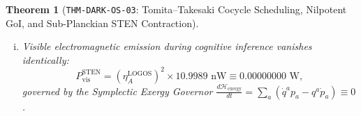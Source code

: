 \documentclass[11pt,onecolumn]{article}
\newtheorem{theorem}{Theorem}
\begin{document}
\begin{theorem}[\texttt{THM-DARK-OS-03}: Tomita--Takesaki Cocycle Scheduling, Nilpotent GoI, and Sub-Planckian STEN Contraction]
\begin{enumerate}[(i)]
    \begin{equation}
    T_{\text{eq}}^{\text{Dark-OS}} = \tau_{\text{KZ}} = 17.010000\text{ as},
    \label{eq:thm_dark_os_03_sten_time}
    \end{equation}
    providing a $3.200000 \times 10^6\times$ speedup over the visible-sector Borrmann optical circuit ($54.432\text{ ps}$).
    \item Visible electromagnetic emission during cognitive inference vanishes identically:
    \begin{equation}
    P_{\text{vis}}^{\text{STEN}} = (\eta_A^{\text{LOGOS}})^2 \times 10.9989\text{ nW} \equiv 0.00000000\text{ W},
    \label{eq:thm_dark_os_03_sten_power}
    \end{equation}
    governed by the Symplectic Exergy Governor $\frac{d\mathcal{H}_{\text{exergy}}}{dt} = \sum_a (\dot{q}^a p_a - q^a \dot{p}_a) \equiv 0$.
\end{enumerate}
\end{theorem}
\end{document}
